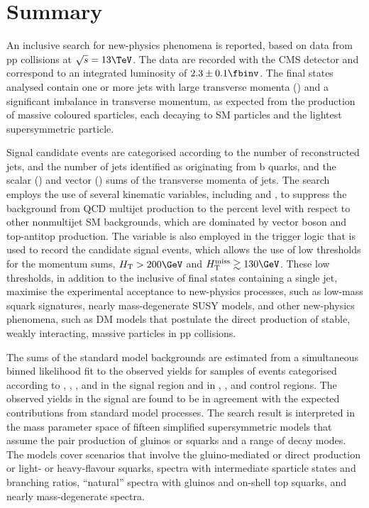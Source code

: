 \section{Summary}
\label{sec:summary}

An inclusive search for new-physics phenomena is reported, based on
data from pp collisions at $\sqrt{s} = 13\TeV$. The data are recorded
with the CMS detector and correspond to an integrated luminosity of
$2.3 \pm 0.1 \fbinv$. The final states analysed contain one or more
jets with large transverse momenta (\Pt) and a significant imbalance
in transverse momentum, as expected from the production of massive
coloured sparticles, each decaying to SM particles and the lightest
supersymmetric particle.

Signal candidate events are categorised according to the number of
reconstructed jets, and the number of jets identified as originating
from b quarks, and the scalar (\scalht) and vector (\HTmiss) sums of
the transverse momenta of jets. 
The search employs the use of several kinematic variables, including
\alphat and \bdphi, to suppress the background from QCD multijet
production to the percent level with respect to other nonmultijet SM
backgrounds, which are dominated by vector boson and top-antitop
production. The \alphat variable is also employed in the trigger logic
that is used to record the candidate signal events, which allows the
use of low thresholds for the momentum sums, $\scalht > 200\GeV$ and
$\HTmiss \gtrsim 130\GeV$. These low thresholds, in addition to the
inclusive of final states containing a single jet, maximise the
experimental acceptance to new-physics processes, such as low-mass
squark signatures, nearly mass-degenerate SUSY models, and other
new-physics phenomena, such as DM models that postulate the direct
production of stable, weakly interacting, massive particles in pp
collisions.

The sums of the standard model backgrounds are estimated from a
simultaneous binned likelihood fit to the observed yields for samples
of events categorised according to \njet, \nb, \scalht, and \HTmiss in
the signal region and in \mj, \mmj, and \gj control regions. The
observed yields in the signal are found to be in agreement with the
expected contributions from standard model processes.  The search
result is interpreted in the mass parameter space of fifteen
simplified supersymmetric models that assume the pair production of
gluinos or squarks and a range of decay modes. The models cover
scenarios that involve the gluino-mediated or direct production or
light- or heavy-flavour squarks, spectra with intermediate sparticle
states and branching ratios, ``natural'' spectra with gluinos and
on-shell top squarks, and nearly mass-degenerate spectra.


